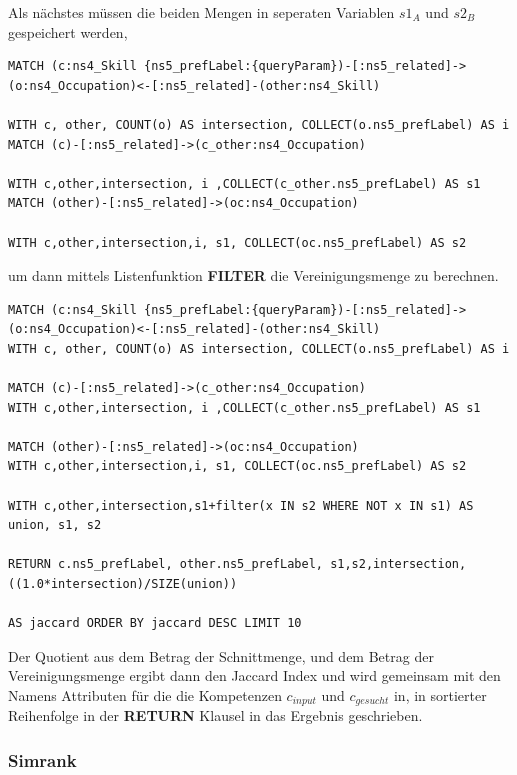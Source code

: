 Als nächstes müssen die beiden Mengen in seperaten Variablen $s1_{A}$ und $s2_{B}$ gespeichert werden,

\begin{lstlisting}
MATCH (c:ns4_Skill {ns5_prefLabel:{queryParam})-[:ns5_related]->(o:ns4_Occupation)<-[:ns5_related]-(other:ns4_Skill)

WITH c, other, COUNT(o) AS intersection, COLLECT(o.ns5_prefLabel) AS i
MATCH (c)-[:ns5_related]->(c_other:ns4_Occupation)

WITH c,other,intersection, i ,COLLECT(c_other.ns5_prefLabel) AS s1
MATCH (other)-[:ns5_related]->(oc:ns4_Occupation)

WITH c,other,intersection,i, s1, COLLECT(oc.ns5_prefLabel) AS s2

\end{lstlisting}

um dann mittels Listenfunktion \textbf{FILTER} die Vereinigungsmenge zu berechnen.
\vspace{1em}

\begin{lstlisting}[language=SPARQL, morekeywords={MATCH, WITH, COLLECT}]
MATCH (c:ns4_Skill {ns5_prefLabel:{queryParam})-[:ns5_related]->(o:ns4_Occupation)<-[:ns5_related]-(other:ns4_Skill)
WITH c, other, COUNT(o) AS intersection, COLLECT(o.ns5_prefLabel) AS i

MATCH (c)-[:ns5_related]->(c_other:ns4_Occupation)
WITH c,other,intersection, i ,COLLECT(c_other.ns5_prefLabel) AS s1

MATCH (other)-[:ns5_related]->(oc:ns4_Occupation)
WITH c,other,intersection,i, s1, COLLECT(oc.ns5_prefLabel) AS s2

WITH c,other,intersection,s1+filter(x IN s2 WHERE NOT x IN s1) AS union, s1, s2

RETURN c.ns5_prefLabel, other.ns5_prefLabel, s1,s2,intersection,((1.0*intersection)/SIZE(union)) 

AS jaccard ORDER BY jaccard DESC LIMIT 10

\end{lstlisting}


Der Quotient aus dem Betrag der Schnittmenge, und dem Betrag der Vereinigungsmenge ergibt dann den Jaccard Index und wird gemeinsam mit den Namens Attributen für die die Kompetenzen $c_{input}$ und $c_{gesucht}$  in, in sortierter Reihenfolge in der \textbf{RETURN} Klausel in das Ergebnis geschrieben.

\subsubsection{Simrank}

